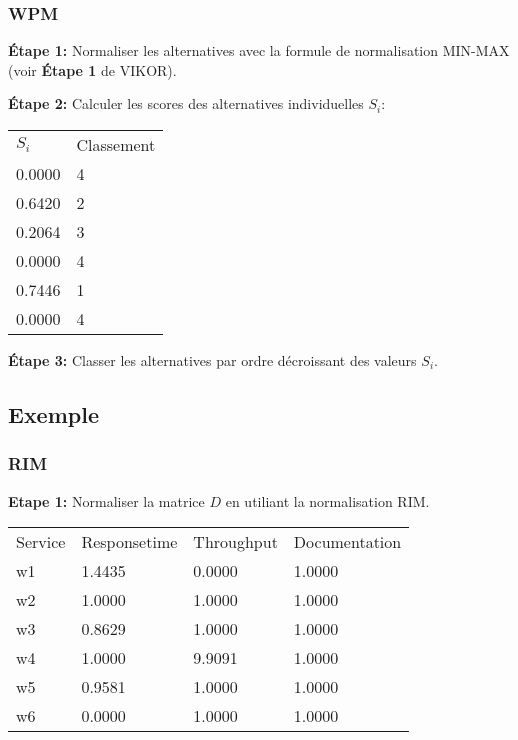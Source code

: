 \documentclass[french, 11pt, a4paper, oldfontcommands]{report}
\begin{document}
	\subsubsection{WPM}
	\par
	\textbf{Étape 1:} Normaliser les alternatives avec la formule de normalisation MIN-MAX (voir \textbf{Étape 1} de VIKOR).
	\par
	\textbf{Étape 2:} Calculer les scores des alternatives individuelles $S_i$:
	\begin{table}[ht]
		\begin{tabular}{ll}
		\rowcolor[HTML]{9B9B9B} 
		$S_i$  & Classement \\
		0.0000 & 4          \\
		0.6420 & 2          \\
		\rowcolor[HTML]{EFEFEF} 
		0.2064 & 3          \\
		0.0000 & 4          \\
		\rowcolor[HTML]{EFEFEF} 
		0.7446 & 1          \\
		0.0000 & 4         
		\end{tabular}
	\end{table}
	\par
	\textbf{Étape 3:}  Classer les alternatives par ordre décroissant des valeurs $S_i$.
	\par
\subsection{Exemple}
	\subsubsection{RIM}
	\textbf{Etape 1:} Normaliser la matrice $D$ en utiliant la normalisation RIM.
	\begin{table}[ht]
		\begin{tabular}{llll}
		\rowcolor[HTML]{9B9B9B} 
		Service & Responsetime & Throughput & Documentation \\
		w1      & 1.4435       & 0.0000     & 1.0000        \\
		\rowcolor[HTML]{EFEFEF} 
		w2      & 1.0000       & 1.0000     & 1.0000        \\
		w3      & 0.8629       & 1.0000     & 1.0000        \\
		\rowcolor[HTML]{EFEFEF} 
		w4      & 1.0000       & 9.9091     & 1.0000        \\
		w5      & 0.9581       & 1.0000     & 1.0000        \\
		\rowcolor[HTML]{EFEFEF} 
		w6      & 0.0000       & 1.0000     & 1.0000       
		\end{tabular}
	\end{table}
	
\end{document}
